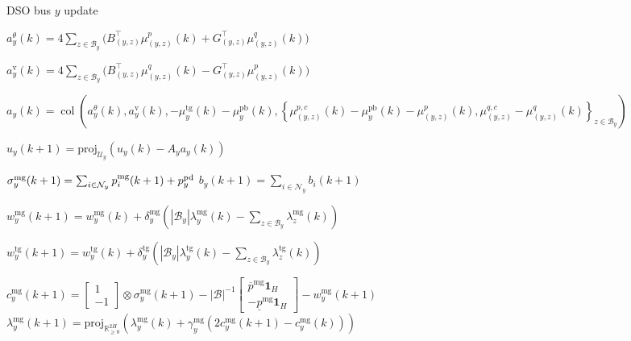 \documentclass[10pt]{article}
\newtheorem{definitiox	n}{Definition}{\it}{}
\newcommand{\mc}{\mathcal}
\newcommand{\bb}{\mathbb}
\newcommand{\R}{\bb R}
\newcommand{\proj}{\mathrm{proj}}
\newcommand{\col}{\operatorname{col}}
\newcommand{\0}{\mathbf{0}}
\newcommand{\1}{\mathbf{1}}
\begin{document}
\begin{algorithm}[H]
\caption{DSO bus $y$ update}
\begin{algorithmic}[1]
\Statex
\Primal{}
\State
$
a^\theta_{y}(k) = 	
4	\sum_{z\in \mc B_y} \big( B_{(y,z)}^\top  \mu^p_{(y,z)}(k) + G_{(y,z)}^\top \mu^q_{(y,z)}(k) \big)$

\State
$
a^{\text{v}}_{y}(k) = 4	
	\sum_{z\in \mc B_y} \big( B_{(y,z)}^\top  \mu^q_{(y,z)}(k)  - G_{(y,z)}^\top \mu^p_{(y,z) }  (k) \big)$



\State
$
a_{y}(k) = \col \left( 	
	a^\theta_{y}(k),a^{\text{v}}_{y}(k),-\mu_y^{\text{tg}}(k) - \mu_y^{\text{pb}}(k), 
	\left\{ \mu^{p,c}_{(y,z)}(k) -\mu_y^{\text{pb}}(k) - \mu_{(y,z)}^p(k) ,  \mu^{q,c}_{(y,z)} -\mu_{(y,z)}^q(k) \right\}_{z \in \mc B_y}
	\right)$

\State 	$u_{y}(k+1) = \proj_{\mc U_{y}}  \left( u_{y}(k) - A_{y} a_{y}(k) \right)$
\EndPrimal

\Agg{}
\State
$ \sigma_y^{\text{mg}}(k+1) = \sum_{i \in \mc N_y} p_i^{\text{mg}}(k+1) + p_y^{\rm{pd}}$
\State
$b_y(k+1) = \sum_{i \in \mc N_y} b_i(k+1)$
\EndAgg


\Aux{}
\State
$ w_y^{\text{mg}}(k+1) = w_y^{\text{mg}}(k) + \delta^{\text{mg}}_y \left( |\mc B_y | \lambda^{\text{mg}}_y (k) - \sum_{z \in \mc B_y} \lambda^{\text{mg}}_z (k) \right) $

\State
$ w_y^{\text{tg}}(k+1) = w_y^{\text{tg}}(k) + \delta^{\text{tg}}_y \left( |\mc B_y | \lambda^{\text{tg}}_y (k) - \sum_{z \in \mc B_y} \lambda^{\text{tg}}_z (k) \right) $

\EndAux
\State



\State
$c^{\text{mg}}_{y}(k+1) = 
	\left[
	\begin{smallmatrix}
	1\\
	- 1 
	\end{smallmatrix}
	\right] \otimes \sigma_y^{\text{mg}}(k+1)
	-
	|\mc B|^{-1}
	\left[
	\begin{smallmatrix}
	\overline{p}^{\mathrm{mg}}\1_{H} \\
	-     \underline{p}^{\mathrm{mg}} \1_{H}
	\end{smallmatrix} 
	\right]  - w_y^{\text{mg}}(k+1)$
	\State
$\lambda_y^{\text{mg}}(k+1) = \textstyle
	\proj_{\R^{2 H}_{\geq 0}}\left( 
	\lambda_y^{\text{mg}}(k) + \gamma_y^{\text{mg}} (2c^{\text{mg}}_{y}(k+1)-c^{\text{mg}}_{y}(k)
	)
	 \right)$


\end{algorithmic}
\end{algorithm}
\end{document}
